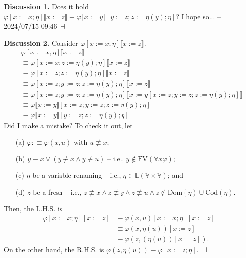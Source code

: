 \documentclass[12pt]{paper}
\newenvironment{context}[1][]
{ \noindent \textbf{{#1}.} }
{ \hfill $ \dashv $ }
\begin{document}
\begin{context}[Discussion 1]
Does it hold $\varphi \left[ x := x ; \eta \right] \llbracket x := z \rrbracket \equiv \varphi \llbracket x := y \rrbracket \left[ y := z ; z := \eta \left( y \right) ; \eta \right]$? \newline
I hope so... -- 2024/07/15 09:46 
\end{context}

\newpage

\begin{context}[Discussion 2]
Consider $\varphi \left[ x := x ; \eta \right] \llbracket x := z \rrbracket$.
\begin{align*}
& \varphi \left[ x := x ; \eta \right] \llbracket x := z \rrbracket \\
& \equiv \varphi \left[ x := x ; z := \eta \left( y \right) ; \eta \right] \llbracket x := z \rrbracket \\
& \equiv \varphi \left[ x := z ; z := \eta \left( y \right) ; \eta \right] \llbracket x := z \rrbracket \\
& \equiv \varphi \left[ x := z ; y := z ; z := \eta \left( y \right) ; \eta \right] \llbracket x := z \rrbracket \\
& \equiv \varphi \left[ x := z ; y := z ; z := \eta \left( y \right) ; \eta \right] \llbracket x := y \left[ x := z ; y := z ; z := \eta \left( y \right) ; \eta \right] \rrbracket \\
& \equiv \varphi \llbracket x := y \rrbracket \left[ x := z ; y := z ; z := \eta \left( y \right) ; \eta \right] \\
& \equiv \varphi \llbracket x := y \rrbracket \left[ y := z ; z := \eta \left( y \right) ; \eta \right]
\end{align*}
Did I make a mistake? To check it out, let
\begin{enumerate}
\item [(a)] $ \varphi : \equiv \varphi \left( x , u \right)$ with $ u \not\equiv x $;
\item [(b)] $ y \equiv x \lor \left( y \not\equiv x \land y \not\equiv u \right) $ -- i.e., $ y \notin \mathrm{FV} \left( \forall x \varphi \right) $;
\item [(c)] $\eta$ be a variable renaming -- i.e., $ \eta \in \mathbb{L} \left( \mathbb{V} \times \mathbb{V} \right) $; and
\item [(d)] $z$ be a fresh -- i.e., $z \not\equiv x \land z \not\equiv y \land z \not\equiv u \land z \notin \mathrm{Dom} \left( \eta \right) \cup \mathrm{Cod} \left( \eta \right)$.
\end{enumerate}
Then, the L.H.S. is
\begin{align*}
\varphi \left[ x := x ; \eta \right] \left[ x := z \right]
& \equiv \varphi \left( x , u \right) \left[ x := x ; \eta \right] \left[ x := z \right] \\
& \equiv \varphi \left( x , \eta \left( u \right) \right) \left[ x := z \right] \\
& \equiv \varphi \left( z , \left( \eta \left( u \right) \right) \left[ x := z \right] \right) .
\end{align*}
On the other hand, the R.H.S. is $\varphi \left( z , \eta \left( u \right) \right) \equiv \varphi \left[ x := z ; \eta \right]$.
\end{context}
\end{document}
